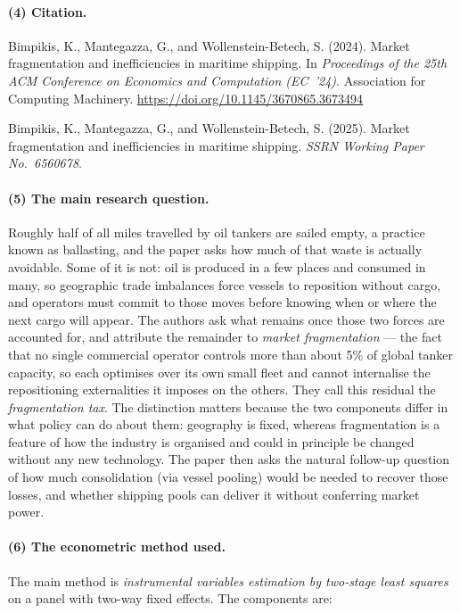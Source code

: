 \documentclass[11pt]{article}
\begin{document}
\paragraph{(4) Citation.}
Bimpikis, K., Mantegazza, G., and Wollenstein-Betech, S. (2024). Market
fragmentation and inefficiencies in maritime shipping. In \emph{Proceedings of
the 25th ACM Conference on Economics and Computation (EC~'24)}. Association for
Computing Machinery. \url{https://doi.org/10.1145/3670865.3673494}

Bimpikis, K., Mantegazza, G., and Wollenstein-Betech, S. (2025). Market
fragmentation and inefficiencies in maritime shipping. \emph{SSRN Working
Paper No.~6560678}.

\paragraph{(5) The main research question.}
Roughly half of all miles travelled by oil tankers are sailed empty, a practice
known as ballasting, and the paper asks how much of that waste is actually
avoidable. Some of it is not: oil is produced in a few places and consumed in
many, so geographic trade imbalances force vessels to reposition without cargo,
and operators must commit to those moves before knowing when or where the next
cargo will appear. The authors ask what remains once those two forces are
accounted for, and attribute the remainder to \emph{market fragmentation} ---
the fact that no single commercial operator controls more than about 5\% of
global tanker capacity, so each optimises over its own small fleet and cannot
internalise the repositioning externalities it imposes on the others. They call
this residual the \emph{fragmentation tax}. The distinction matters because the
two components differ in what policy can do about them: geography is fixed,
whereas fragmentation is a feature of how the industry is organised and could in
principle be changed without any new technology. The paper then asks the
natural follow-up question of how much consolidation (via vessel pooling) would be needed to recover those losses, and whether shipping pools can deliver it without conferring
market power.

\paragraph{(6) The econometric method used.}
The main method is \emph{instrumental variables estimation by two-stage least
squares} on a panel with two-way fixed effects. The components are:
\end{document}
